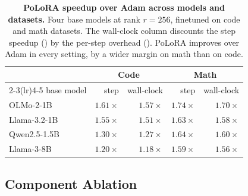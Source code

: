\documentclass[11pt]{article}
\newcommand{\methodname}{PoLoRA\xspace}
\begin{document}
\begin{table}[t]
\centering\small
\begin{tabular}{lrrrr}
\toprule
 & \multicolumn{2}{c}{Code} & \multicolumn{2}{c}{Math} \\
\cmidrule(lr){2-3}\cmidrule(lr){4-5}
base model & step & wall-clock & step & wall-clock \\
\midrule
OLMo-2-1B & $1.61\times$ & $1.57\times$ & $1.74\times$ & $1.70\times$ \\
Llama-3.2-1B & $1.55\times$ & $1.51\times$ & $1.63\times$ & $1.58\times$ \\
Qwen2.5-1.5B & $1.30\times$ & $1.27\times$ & $1.64\times$ & $1.60\times$ \\
Llama-3-8B & $1.20\times$ & $1.18\times$ & $1.59\times$ & $1.56\times$ \\
\bottomrule
\end{tabular}
\caption{\textbf{\methodname{} speedup over Adam across models and datasets.} Four base models at rank $r=256$, finetuned on code and math datasets. The wall-clock column discounts the step speedup () by the per-step overhead (). \methodname{} improves over Adam in every setting, by a wider margin on math than on code.}
\label{tab:breadth}
\end{table}

\subsection{Component Ablation}
\label{sec:exp-ablation}
\end{document}
